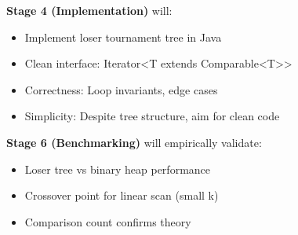 \documentclass[11pt]{article}
\begin{document}
\textbf{Stage 4 (Implementation)} will:
\begin{itemize}
    \item Implement loser tournament tree in Java
    \item Clean interface: Iterator<T extends Comparable<T>>
    \item Correctness: Loop invariants, edge cases
    \item Simplicity: Despite tree structure, aim for clean code
\end{itemize}

\textbf{Stage 6 (Benchmarking)} will empirically validate:
\begin{itemize}
    \item Loser tree vs binary heap performance
    \item Crossover point for linear scan (small k)
    \item Comparison count confirms theory
\end{itemize}
\end{document}
